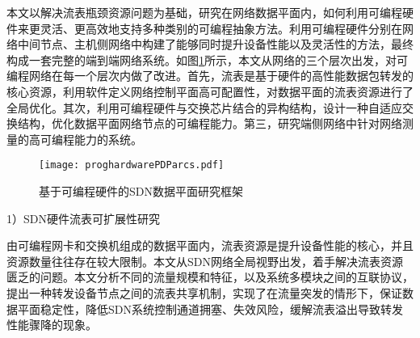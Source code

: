 \label{chap12}

本文以解决流表瓶颈资源问题为基础，研究在网络数据平面内，如何利用可编程硬件来更灵活、更高效地支持多种类别的可编程抽象方法。利用可编程硬件分别在网络中间节点、主机侧网络中构建了能够同时提升设备性能以及灵活性的方法，最终构成一套完整的端到端网络系统。如图\ref{fig:proghardwarePDParcs}所示，本文从网络的三个层次出发，对可编程网络在每一个层次内做了改进。首先，流表是基于硬件的高性能数据包转发的核心资源，利用软件定义网络控制平面高可配置性，对数据平面的流表资源进行了全局优化。其次，利用可编程硬件与交换芯片结合的异构结构，设计一种自适应交换结构，优化数据平面网络节点的可编程能力。第三，研究端侧网络中针对网络测量的高可编程能力的系统。
%
%
%


\begin{figure}[!ht]
	\centering 
	\vspace{-1.5mm} 
	\texttt{[image: proghardwarePDParcs.pdf]}
	\caption{基于可编程硬件的SDN数据平面研究框架} \label{fig:proghardwarePDParcs}
\end{figure}


1）SDN硬件流表可扩展性研究

由可编程网卡和交换机组成的数据平面内，流表资源是提升设备性能的核心，并且资源数量往往存在较大限制。本文从SDN网络全局视野出发，着手解决流表资源匮乏的问题。本文分析不同的流量规模和特征，以及系统多模块之间的互联协议，提出一种转发设备节点之间的流表共享机制，实现了在流量突发的情形下，保证数据平面稳定性，降低SDN系统控制通道拥塞、失效风险，缓解流表溢出导致转发性能骤降的现象。




